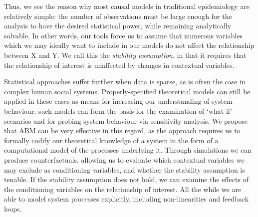 \documentclass[review]{elsarticle}
\begin{document}
Thus, we see the reason why most causal models in traditional epidemiology are relatively simple: the number of observations must be large enough for the analysis to have the desired statistical power, while remaining analytically solvable.  In other words, our tools force us to assume that numerous variables which we may ideally want to include in our models do not affect the relationship between X and Y.  We call this the \emph{stability assumption}, in that it requires that the relationship of interest is unaffected by changes in contextual variables.



Statistical approaches suffer further when data is sparse, as is often the case in complex human social systems.  Properly-specified theoretical models can still be applied in these cases as means for increasing our understanding of system behaviour; such models can form the basis for the examination of `what if' scenarios and for probing system behaviour via sensitivity analysis.  We propose that ABM can be very effective in this regard, as the approach requires us to formally codify our theoretical knowledge of a system in the form of a computational model of the processes underlying it.  Through simulations we can produce counterfactuals, allowing us to evaluate which contextual variables we may exclude as conditioning variables, and whether the stability assumption is tenable.  If the stability assumption does not hold, we can examine the effects of the conditioning variables on the relationship of interest.  All the while we are able to model system processes explicitly, including non-linearities and feedback loops.
\end{document}
